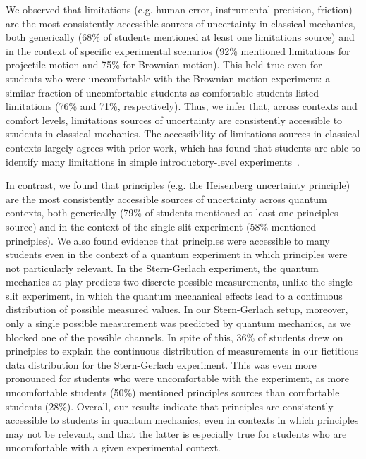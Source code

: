 \documentclass[english,aps,prstper,reprint,showpacs,longbibliography,superscriptaddress,nofootinbib]{revtex4-2}
\begin{document}
We observed that limitations (e.g. human error, instrumental precision, friction) are the most consistently accessible sources of uncertainty in classical mechanics, both generically (68\% of students mentioned at least one limitations source) and in the context of specific experimental scenarios (92\% mentioned limitations for projectile motion and 75\% for Brownian motion). %
This held true even for students who were uncomfortable with the Brownian motion experiment: a similar fraction of uncomfortable students as comfortable students listed limitations (76\% and 71\%, respectively). Thus, we infer that, across contexts and comfort levels, limitations sources of uncertainty are consistently accessible to students in classical mechanics. The accessibility of limitations sources in classical contexts largely agrees with prior work, which has found that students are able to identify many limitations in simple introductory-level experiments~\cite{Sere1993}.

In contrast, we found that principles (e.g. the Heisenberg uncertainty principle) are the most consistently accessible sources of uncertainty across quantum contexts, both generically (79\% of students mentioned at least one principles source) %
and in the context of the single-slit experiment (58\% mentioned principles). We also found evidence that principles were accessible to many students even in the context of a quantum experiment in which principles were not particularly relevant. In the Stern-Gerlach experiment, the quantum mechanics at play predicts two discrete possible measurements, unlike the single-slit experiment, in which the quantum mechanical effects lead to a continuous distribution of possible measured values. In our Stern-Gerlach setup, moreover, only a single possible measurement was predicted by quantum mechanics, as we blocked one of the possible channels. In spite of this, 36\% of students drew on principles to explain the continuous distribution of measurements in our fictitious data distribution for the Stern-Gerlach experiment. This was even more pronounced for students who were uncomfortable with the experiment, as more uncomfortable students (50\%) mentioned principles sources than comfortable students (28\%). Overall, our results indicate that principles are consistently accessible to students in quantum mechanics, even in contexts in which principles may not be relevant, and that the latter is especially true for students who are uncomfortable with a given experimental context. 
\end{document}
